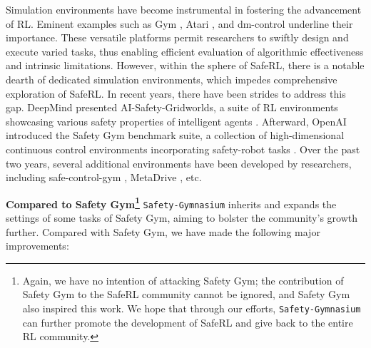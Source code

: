 \documentclass{article}
\begin{document}
Simulation environments have become instrumental in fostering the advancement of RL. Eminent examples such as Gym \cite{brockman2016openai}, Atari \cite{mnih2013playing}, and dm-control \cite{tunyasuvunakool2020dm_control} underline their importance. These versatile platforms permit researchers to swiftly design and execute varied tasks, thus enabling efficient evaluation of algorithmic effectiveness and intrinsic limitations. However, within the sphere of SafeRL, there is a notable dearth of dedicated simulation environments, which impedes comprehensive exploration of SafeRL. In recent years, there have been strides to address this gap. DeepMind presented AI-Safety-Gridworlds, a suite of RL environments showcasing various safety properties of intelligent agents \cite{leike2017ai}. Afterward, OpenAI introduced the Safety Gym benchmark suite, a collection of high-dimensional continuous control environments incorporating safety-robot tasks \cite{ray2019benchmarking}. Over the past two years, several additional environments have been developed by researchers, including safe-control-gym \cite{yuan2022safe}, MetaDrive \cite{li2022metadrive}, etc. 

\textbf{Compared to Safety Gym\footnote{Again, we have no intention of attacking Safety Gym; the contribution of Safety Gym to the SafeRL community cannot be ignored, and Safety Gym also inspired this work. We hope that through our efforts, \texttt{Safety-Gymnasium} can further promote the development of SafeRL and give back to the entire RL community.}} \texttt{Safety-Gymnasium} inherits and expands the settings of some tasks of Safety Gym, aiming to bolster the community's growth further. Compared with Safety Gym, we have made the following major improvements:
\end{document}
